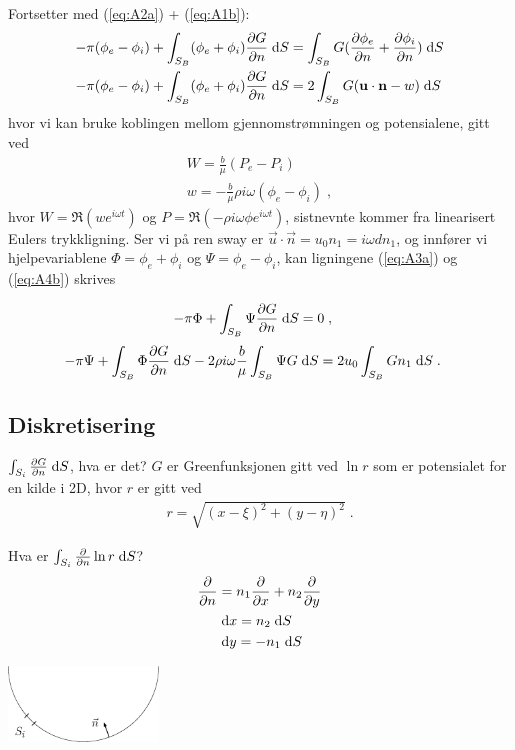 \documentclass[a4paper,norsk]{article}
\begin{document}
Fortsetter med (\ref{eq:A2a}) + (\ref{eq:A1b}):
\begin{align}
  -\pi(\phi_e - \phi_i) + \int_{S_B} (\phi_e + \phi_i) \frac{\partial G}{\partial n}\;\mathrm{d} S
          &= \int_{S_B}G (\frac{\partial \phi_e}{\partial n} + \frac{\partial \phi_i}{\partial n}) \;\mathrm{d} S \notag \\
  -\pi(\phi_e - \phi_i) + \int_{S_B} (\phi_e + \phi_i) \frac{\partial G}{\partial n}\;\mathrm{d} S
        &= 2\int_{S_B}G (\mathbf{u}\cdot\mathbf{n} - w) \;\mathrm{d} S \label{eq:A4b}
\end{align}
hvor vi kan bruke koblingen mellom gjennomstrømningen og potensialene, gitt ved
\begin{align*}
  W = \frac{b}{\mu}(P_e - P_i) \\
  w = -\frac{b}{\mu}\rho i \omega (\phi_e - \phi_i) \;,
\end{align*}
hvor $W = \Re (we^{i\omega t})$ og $P = \Re (-\rho i\omega\phi e^{i\omega t})$,
sistnevnte kommer fra linearisert Eulers trykkligning. 
Ser vi på ren sway er $\vec{u}\cdot\vec{n} = u_0n_1=i\omega dn_1$, og innfører vi
hjelpevariablene $\Phi = \phi_e + \phi_i$ og $\Psi = \phi_e - \phi_i$, kan
ligningene (\ref{eq:A3a}) og (\ref{eq:A4b}) skrives

\begin{align}\label{eq:A5a}
  -\pi\Phi + \int_{S_B} \Psi\frac{\partial G}{\partial n}\;\mathrm{d} S &= 0\;,
\end{align}
\begin{align}\label{eq:A5b}
  -\pi\Psi + \int_{S_B} \Phi \frac{\partial G}{\partial n}\;\mathrm{d} S
                    - 2\rho i\omega\frac{b}{\mu}\int_{S_B}\Psi G \;\mathrm{d} S
        &= 2 u_0 \int_{S_B}Gn_1 \;\mathrm{d} S \;.
\end{align}

\newpage
\subsection*{Diskretisering}
$\int_{S_i} \frac{\partial G}{\partial n}\;\mathrm{d} S$, hva er det?
\noindent $G$ er Greenfunksjonen gitt ved $\ln r$ som er potensialet for en
kilde i 2D, hvor $r$ er gitt ved
\begin{align*}
  r = \sqrt{(x-\xi)^2 + (y-\eta)^2} \;.
\end{align*}

\noindent\begin{minipage}{.45\textwidth}
\vspace{5mm}Hva er $\int_{S_i} \frac{\partial }{\partial n}\ln r\;\mathrm{d} S$?
\begin{align*}
  \frac{\partial }{\partial n}& = n_1\frac{\partial }{\partial x} + n_2\frac{\partial }{\partial y} \\
  &\;\mathrm{d} x = n_2 \;\mathrm{d} S  \\
  &\;\mathrm{d} y = -n_1 \;\mathrm{d} S
\end{align*}
\end{minipage}\hfill
\begin{minipage}{.45\textwidth}
\vspace{5mm}
\includegraphics[width=4cm]{Si.eps}
\end{minipage}
\end{document}

